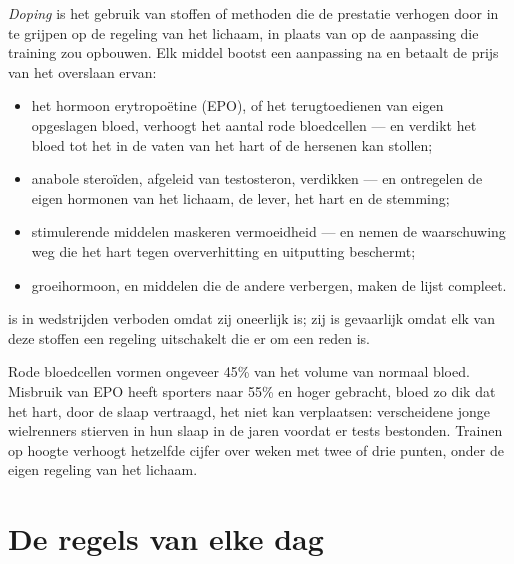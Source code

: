 \begin{proposition}[Doping]\label{prop:g10:sport-and-health:doping}
\emph{Doping} is het gebruik van stoffen of methoden die de
prestatie verhogen door in te grijpen op de regeling van het lichaam, in
plaats van op de aanpassing die training zou opbouwen. Elk middel bootst
een aanpassing na en betaalt de prijs van het overslaan ervan:
\begin{itemize}
  \item het hormoon erytropoëtine (EPO), of het terugtoedienen van eigen
        opgeslagen bloed, verhoogt het aantal rode bloedcellen --- en
        verdikt het bloed tot het in de vaten van het hart of de hersenen
        kan stollen;
  \item anabole steroïden, afgeleid van testosteron, verdikken
         --- en ontregelen de eigen hormonen van het lichaam,
        de lever, het hart en de stemming;
  \item stimulerende middelen maskeren vermoeidheid --- en nemen de
        waarschuwing weg die het hart tegen oververhitting en uitputting
        beschermt;
  \item groeihormoon, en middelen die de andere verbergen, maken de lijst
        compleet.
\end{itemize}
 is in wedstrijden verboden omdat zij oneerlijk is; zij is
gevaarlijk omdat elk van deze stoffen een regeling uitschakelt die er om
een reden is.
\end{proposition}
\admitted

\begin{example}\label{ex:g10:sport-and-health:epo}
Rode bloedcellen vormen ongeveer 45\% van het volume van normaal bloed.
Misbruik van EPO heeft sporters naar 55\% en hoger gebracht, bloed zo dik
dat het hart, door de slaap vertraagd, het niet kan verplaatsen:
verscheidene jonge wielrenners stierven in hun slaap in de jaren voordat
er tests bestonden. Trainen op hoogte verhoogt hetzelfde cijfer over
weken met twee of drie punten, onder de eigen regeling van het lichaam.
\end{example}

\section{De regels van elke dag}

